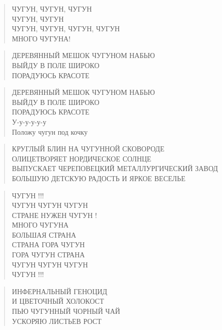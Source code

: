 \poemtitle{***}
\begin{verse}
ЧУГУН, ЧУГУН, ЧУГУН\\
ЧУГУН, ЧУГУН\\
ЧУГУН, ЧУГУН, ЧУГУН, ЧУГУН\\
МНОГО ЧУГУНА!
\end{verse}

\poemtitle{***}
\begin{verse}
ДЕРЕВЯННЫЙ МЕШОК ЧУГУНОМ НАБЬЮ\\
ВЫЙДУ В ПОЛЕ ШИРОКО\\
ПОРАДУЮСЬ КРАСОТЕ
\end{verse}

\poemtitle{***}
\begin{verse}
ДЕРЕВЯННЫЙ МЕШОК ЧУГУНОМ НАБЬЮ\\
ВЫЙДУ В ПОЛЕ ШИРОКО\\
ПОРАДУЮСЬ КРАСОТЕ\\
У-у-у-у-у-у\\
Положу чугун под кочку
\end{verse}

\poemtitle{***}
\begin{verse}
КРУГЛЫЙ БЛИН НА ЧУГУННОЙ СКОВОРОДЕ\\
ОЛИЦЕТВОРЯЕТ НОРДИЧЕСКОЕ СОЛНЦЕ\\
ВЫПУСКАЕТ ЧЕРЕПОВЕЦКИЙ МЕТАЛЛУРГИЧЕСКИЙ ЗАВОД\\
БОЛЬШУЮ ДЕТСКУЮ РАДОСТЬ И ЯРКОЕ ВЕСЕЛЬЕ
\end{verse}

\poemtitle{***}
\begin{verse}
ЧУГУН !!! \\
ЧУГУН ЧУГУН ЧУГУН\\
СТРАНЕ НУЖЕН ЧУГУН !\\
МНОГО ЧУГУНА\\
БОЛЬШАЯ СТРАНА\\
СТРАНА ГОРА ЧУГУН\\
ГОРА ЧУГУН СТРАНА\\
ЧУГУН ЧУГУН ЧУГУН \\
ЧУГУН !!!
\end{verse}

\poemtitle{***}
\begin{verse}
ИНФЕРНАЛЬНЫЙ ГЕНОЦИД\\
И ЦВЕТОЧНЫЙ ХОЛОКОСТ\\
ПЬЮ ЧУГУННЫЙ ЧОРНЫЙ ЧАЙ\\
УСКОРЯЮ ЛИСТЬЕВ РОСТ
\end{verse}

